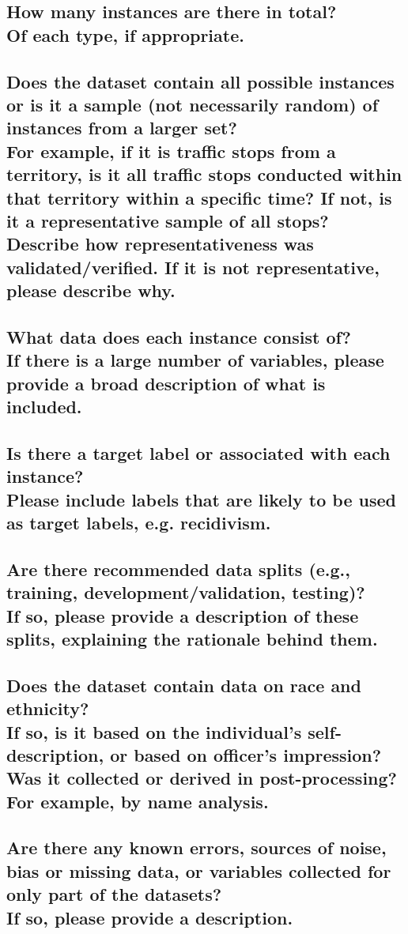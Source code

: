 \documentclass[letterpaper, 10 pt, conference]{ieeeconf}  %
\newcommand{\subtitle}[1]{{\\ \small \normalfont \color{purple} #1}}
\begin{document}
\subsection{How many instances are there in total? \subtitle{Of each type, if appropriate.}}

\subsection{Does the dataset contain all possible instances or is it a sample (not necessarily random) of instances from a larger set? \subtitle{For example, if it is traffic stops from a territory, is it all traffic stops conducted within that territory within a specific time? If not, is it a representative sample of all stops? Describe how representativeness was validated/verified. If it is not representative, please describe why.}}

\subsection{What data does each instance consist of? \subtitle{If there is a large number of variables, please provide a broad description of what is included.}}

\subsection{Is there a target label or associated with each instance? \subtitle{Please include labels that are likely to be used as target labels, e.g. recidivism.}}

\subsection{Are there recommended data splits (e.g., training, development/validation, testing)? \subtitle{If so, please provide a description of these splits, explaining the rationale behind them.}}

\subsection{Does the dataset contain data on race and ethnicity? \subtitle{If so, is it based on the individual's self-description, or based on officer's impression? Was it collected or derived in post-processing? For example, by name analysis.}}

\subsection{Are there any known errors, sources of noise, bias or missing data, or variables collected for only part of the datasets? \subtitle{If so, please provide a description.}}
\end{document}
